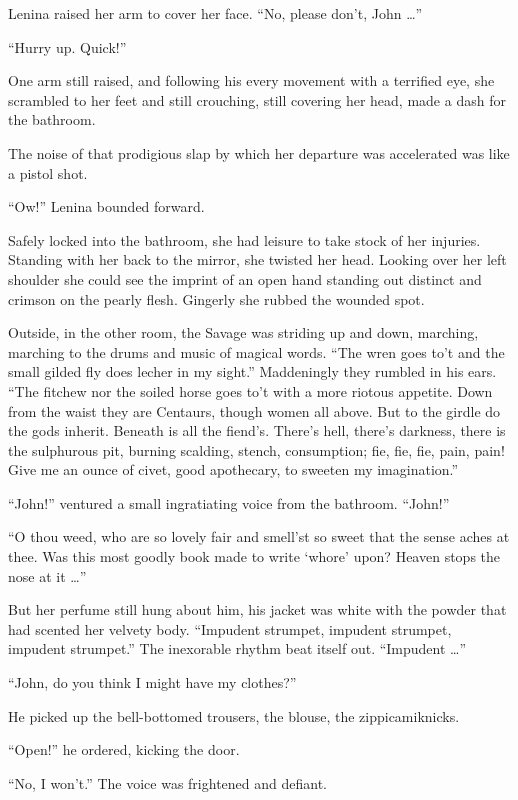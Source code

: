 \documentclass[12pt]{report}
\begin{document}
Lenina raised her arm to cover her face. ``No, please don't, John
\ldots{}''

``Hurry up. Quick!''

One arm still raised, and following his every movement with a terrified
eye, she scrambled to her feet and still crouching, still covering her
head, made a dash for the bathroom.

The noise of that prodigious slap by which her departure was accelerated
was like a pistol shot.

``Ow!'' Lenina bounded forward.

Safely locked into the bathroom, she had leisure to take stock of her
injuries. Standing with her back to the mirror, she twisted her head.
Looking over her left shoulder she could see the imprint of an open hand
standing out distinct and crimson on the pearly flesh. Gingerly she
rubbed the wounded spot.

Outside, in the other room, the Savage was striding up and down,
marching, marching to the drums and music of magical words. ``The wren
goes to't and the small gilded fly does lecher in my sight.''
Maddeningly they rumbled in his ears. ``The fitchew nor the soiled horse
goes to't with a more riotous appetite. Down from the waist they are
Centaurs, though women all above. But to the girdle do the gods inherit.
Beneath is all the fiend's. There's hell, there's darkness, there is the
sulphurous pit, burning scalding, stench, consumption; fie, fie, fie,
pain, pain! Give me an ounce of civet, good apothecary, to sweeten my
imagination.''

``John!'' ventured a small ingratiating voice from the bathroom.
``John!''

``O thou weed, who are so lovely fair and smell'st so sweet that the
sense aches at thee. Was this most goodly book made to write `whore'
upon? Heaven stops the nose at it \ldots{}''

But her perfume still hung about him, his jacket was white with the
powder that had scented her velvety body. ``Impudent strumpet, impudent
strumpet, impudent strumpet.'' The inexorable rhythm beat itself out.
``Impudent \ldots{}''

``John, do you think I might have my clothes?''

He picked up the bell-bottomed trousers, the blouse, the
zippicamiknicks.

``Open!'' he ordered, kicking the door.

``No, I won't.'' The voice was frightened and defiant.
\end{document}
